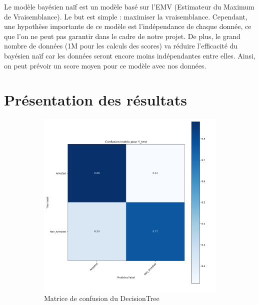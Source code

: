 \documentclass{article}
\begin{document}
    Le modèle bayésien naïf est un modèle basé sur l'EMV
    (Estimateur du Maximum de Vraisemblance).
    Le but est simple : maximiser la vraisemblance. 
    Cependant, une hypothèse importante de ce modèle est l'indépendance de chaque donnée,
    ce que l'on ne peut pas garantir dans le cadre de notre projet.
    De plus, le grand nombre de données (1M pour les calculs des scores) va réduire l'efficacité du bayésien naïf car les données seront encore moins indépendantes entre elles.
    Ainsi, on peut prévoir un score moyen pour ce modèle avec nos données.
    

    \section{Présentation des résultats}

    \begin{figure}[H]
	    \begin{subfigure}{.45\textwidth}
		    \includegraphics[scale=.314]{images/MatriceConfusionDecisionTree.png}
		    \centering
		    \caption{Matrice de confusion du DecisionTree}
	    \end{subfigure}
	    \begin{subfigure}{.45\textwidth}
		    \centering

\end{subfigure}
\end{figure}
\end{document}
